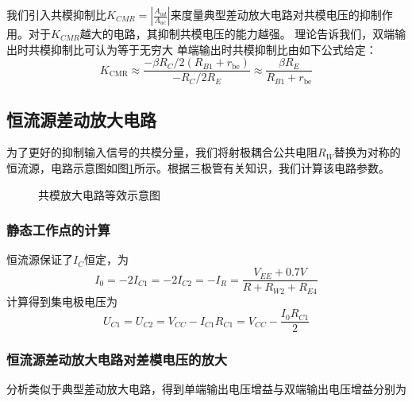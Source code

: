 \documentclass[a4paper,11pt,UTF8]{ctexart}
\begin{document}
	我们引入共模抑制比$K_{CMR} = |\frac{A_{ud}}{A_{uc}}|$来度量典型差动放大电路对共模电压的抑制作用。对于$K_{CMR}$越大的电路，其抑制共模电压的能力越强。
	理论告诉我们，双端输出时共模抑制比可认为等于无穷大
	单端输出时共模抑制比由如下公式给定：
	\begin{equation}
		K_{\mathrm{CMR}} \approx \frac{-\beta R_{C} / 2\left(R_{B 1}+r_{\mathrm{be}}\right)}{-R_{C} / 2 R_{E}} \approx \frac{\beta R_{E}}{R_{B 1}+r_{\mathrm{be}}}
	\end{equation}
	
	\subsection{恒流源差动放大电路}
	 为了更好的抑制输入信号的共模分量，我们将射极耦合公共电阻$R_W$替换为对称的恒流源，电路示意图如图\ref{fig:CCCstru}所示。根据三极管有关知识，我们计算该电路参数。
	 \begin{figure}[H]
	 	\centering
	 	\caption{共模放大电路等效示意图}
	 	\label{fig:CCCstru}
	 \end{figure}
	
	
	\subsubsection{静态工作点的计算}
	恒流源保证了$I_C$恒定，为
	\begin{equation}
		I_0=-2I_{C1}=-2I_{C2}=-I_R=\frac{V_{EE}+0.7V}{R+R_{W2}+R_{E4}}
	\end{equation}
	计算得到集电极电压为
	\begin{equation}
		U_{C1}=U_{C2}=V_{CC}-I_{C1}R_{C1}=V_{CC}-\frac{I_0R_{C1}}{2}
	\end{equation}
	
	
	\subsubsection{恒流源差动放大电路对差模电压的放大}
	分析类似于典型差动放大电路，得到单端输出电压增益与双端输出电压增益分别为
	
\end{document}
